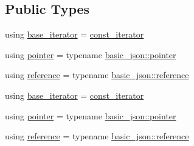 \subsection*{Public Types}
\begin{DoxyCompactItemize}
\item 
using \hyperlink{classnlohmann_1_1basic__json_1_1iterator_ac48754e4dc48d65d95294bd170dcd857}{base\-\_\-iterator} = \hyperlink{classnlohmann_1_1basic__json_1_1const__iterator}{const\-\_\-iterator}
\item 
using \hyperlink{classnlohmann_1_1basic__json_1_1iterator_a3aae1df93a78b201d98e178c1c7d02a7}{pointer} = typename \hyperlink{classnlohmann_1_1basic__json_a9d1b58099dc64695fcf2847ab0b2a7c7}{basic\-\_\-json\-::pointer}
\item 
using \hyperlink{classnlohmann_1_1basic__json_1_1iterator_a97aff5d71246774267a81066460dd1cf}{reference} = typename \hyperlink{classnlohmann_1_1basic__json_a3ec8e17be8732fe436e9d6733f52b7a3}{basic\-\_\-json\-::reference}
\item 
using \hyperlink{classnlohmann_1_1basic__json_1_1iterator_ac48754e4dc48d65d95294bd170dcd857}{base\-\_\-iterator} = \hyperlink{classnlohmann_1_1basic__json_1_1const__iterator}{const\-\_\-iterator}
\item 
using \hyperlink{classnlohmann_1_1basic__json_1_1iterator_a3aae1df93a78b201d98e178c1c7d02a7}{pointer} = typename \hyperlink{classnlohmann_1_1basic__json_a9d1b58099dc64695fcf2847ab0b2a7c7}{basic\-\_\-json\-::pointer}
\item 
using \hyperlink{classnlohmann_1_1basic__json_1_1iterator_a97aff5d71246774267a81066460dd1cf}{reference} = typename \hyperlink{classnlohmann_1_1basic__json_a3ec8e17be8732fe436e9d6733f52b7a3}{basic\-\_\-json\-::reference}
\end{DoxyCompactItemize}
